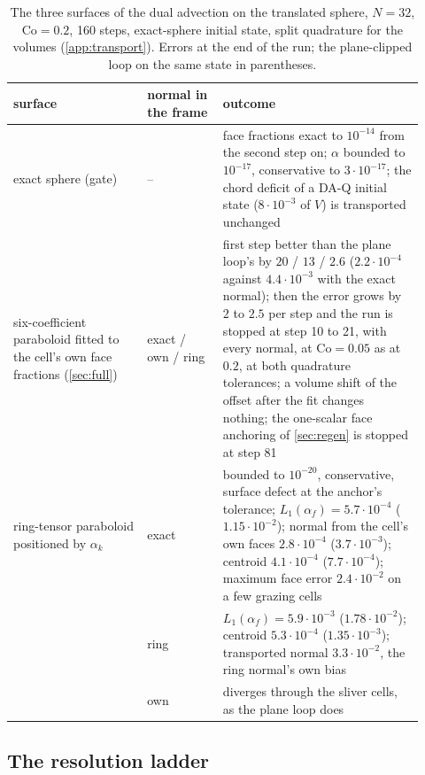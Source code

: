 \documentclass[preprint,12pt]{elsarticle}
\begin{document}
\begin{table}[htbp]
\centering
\caption{The three surfaces of the dual advection on the translated sphere, $N = 32$, $\mathrm{Co} = 0.2$, 160 steps, exact-sphere initial state, split quadrature for the volumes (\ref{app:transport}). Errors at the end of the run; the plane-clipped loop on the same state in parentheses.}
\label{tab:tpf-surfaces}
\footnotesize
\begin{tabular}{p{0.30\linewidth}p{0.17\linewidth}p{0.45\linewidth}}
\toprule
surface & normal in the frame & outcome \\
\midrule
exact sphere (gate) & -- & face fractions exact to $10^{-14}$ from the second step on; $\alpha$ bounded to $10^{-17}$, conservative to $3\cdot10^{-17}$; the chord deficit of a DA-Q initial state ($8\cdot10^{-3}$ of $V$) is transported unchanged \\
\midrule
six-coefficient paraboloid fitted to the cell's own face fractions (\cref{sec:full}) & exact / own / ring & first step better than the plane loop's by $20$ / $13$ / $2.6$ ($2.2\cdot10^{-4}$ against $4.4\cdot10^{-3}$ with the exact normal); then the error grows by $2$ to $2.5$ per step and the run is stopped at step 10 to 21, with every normal, at $\mathrm{Co} = 0.05$ as at $0.2$, at both quadrature tolerances; a volume shift of the offset after the fit changes nothing; the one-scalar face anchoring of \cref{sec:regen} is stopped at step 81 \\
\midrule
ring-tensor paraboloid positioned by $\alpha_k$ & exact & bounded to $10^{-20}$, conservative, surface defect at the anchor's tolerance; $L_1(\alpha_f) = 5.7\cdot10^{-4}$ ($1.15\cdot10^{-2}$); normal from the cell's own faces $2.8\cdot10^{-4}$ ($3.7\cdot10^{-3}$); centroid $4.1\cdot10^{-4}$ ($7.7\cdot10^{-4}$); maximum face error $2.4\cdot10^{-2}$ on a few grazing cells \\
 & ring & $L_1(\alpha_f) = 5.9\cdot10^{-3}$ ($1.78\cdot10^{-2}$); centroid $5.3\cdot10^{-4}$ ($1.35\cdot10^{-3}$); transported normal $3.3\cdot10^{-2}$, the ring normal's own bias \\
 & own & diverges through the sliver cells, as the plane loop does \\
\bottomrule
\end{tabular}
\end{table}

\subsection{The resolution ladder}
\label{sec:tpf-ladder}
\end{document}
